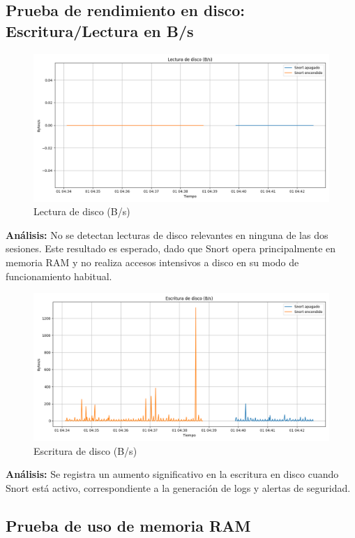 \documentclass[11pt,a4paper,twoside]{report}
\begin{document}
\subsection*{Prueba de rendimiento en disco: Escritura/Lectura en B/s}


\begin{figure}[H]
	\centering
	\includegraphics[width=\textwidth]{graficas/disk_read.png}
	\caption{Lectura de disco (B/s)}
\end{figure}
\textbf{Análisis:} No se detectan lecturas de disco relevantes en ninguna de las dos sesiones. Este resultado es esperado, dado que Snort opera principalmente en memoria RAM y no realiza accesos intensivos a disco en su modo de funcionamiento habitual.


\begin{figure}[H]
	\centering
	\includegraphics[width=\textwidth]{graficas/disk_write.png}
	\caption{Escritura de disco (B/s)}
\end{figure}
\textbf{Análisis:} Se registra un aumento significativo en la escritura en disco cuando Snort está activo, correspondiente a la generación de logs y alertas de seguridad.

\subsection*{Prueba de uso de memoria RAM}
\end{document}
